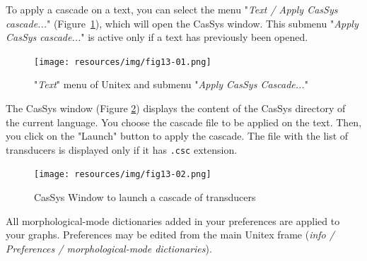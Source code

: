 To apply a cascade on a text, you can select the menu "\textit{Text / Apply CasSys cascade...}" (Figure~\ref{fig13-01}), which will open the CasSys window.
This submenu "\textit{Apply CasSys cascade...}" is active only if a text has previously been opened.

\begin{figure}[!htb]
 \centering
 \texttt{[image: resources/img/fig13-01.png]}
 \caption{"\textit{Text}" menu of Unitex and submenu "\textit{Apply CasSys Cascade...}"}
 \label{fig13-01}
\end{figure}


The CasSys window (Figure \ref{fig13-02}) displays the content of the CasSys directory of the current language. You choose 
the cascade file to be applied on the text. Then, you click on the "Launch" button to apply the cascade. The file with the list of transducers is displayed only if it has \verb+.csc+ extension.

\begin{figure}[!htb]
  \centering
  \texttt{[image: resources/img/fig13-02.png]}
  \caption{CasSys Window to launch a cascade of transducers}
  \label{fig13-02}
\end{figure}

All morphological-mode dictionaries added in your preferences are applied to your
graphs. Preferences may be edited from the main Unitex frame (\textit{info / Preferences / morphological-mode dictionaries}).

%



